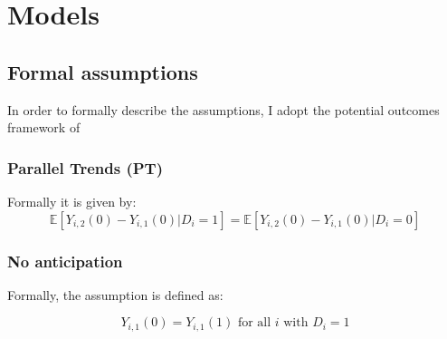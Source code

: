 \documentclass[12pt]{article}
\begin{document}
\section{Models}\label{app:models}

\subsection{Formal assumptions}\label{app:models:assumptions}
In order to formally describe the assumptions, I adopt the potential outcomes framework of~\cite{rubinEstimatingCausalEffects1974}

\subsubsection{Parallel Trends (PT)}

Formally it is given by: 
\begin{equation}
    \mathbb{E}[Y_{i,2}(0) - Y_{i,1}(0) | D_i = 1] = \mathbb{E}[Y_{i,2}(0) - Y_{i,1}(0) | D_i = 0]
\end{equation}

\subsubsection{No anticipation}
Formally, the assumption is defined as:

\begin{equation}
    Y_{i,1}(0) = Y_{i,1}(1) \text{ for all } i \text{ with } D_i = 1
\end{equation}


\end{document}
